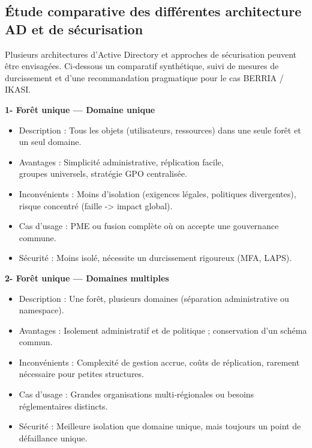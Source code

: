 \newpage

\subsection*{Étude comparative des différentes architecture AD et de sécurisation}
{}
\noindent Plusieurs architectures d'Active Directory et approches de sécurisation peuvent être envisagées. Ci‑dessous un comparatif synthétique, suivi de mesures de durcissement et d'une recommandation pragmatique pour le cas BERRIA / IKASI.

\noindent \textbf{1- Forêt unique — Domaine unique}
\begin{itemize}
	\item Description : Tous les objets (utilisateurs, ressources) dans une seule forêt et un seul domaine.
	\item Avantages : Simplicité administrative, réplication facile, \\ groupes universels, stratégie GPO centralisée.
	\item Inconvénients : Moins d'isolation (exigences légales, politiques divergentes), risque concentré (faille -> impact global).
	\item Cas d'usage : PME ou fusion complète où on accepte une gouvernance commune.
	\item Sécurité : Moins isolé, nécessite un durcissement rigoureux (MFA, LAPS).
\end{itemize}

\noindent \textbf{2- Forêt unique — Domaines multiples}
\begin{itemize}
	\item Description : Une forêt, plusieurs domaines (séparation administrative ou namespace).
	\item Avantages : Isolement administratif et de politique ; conservation d'un schéma commun.
	\item Inconvénients : Complexité de gestion accrue, coûts de réplication, rarement nécessaire pour petites structures.
	\item Cas d'usage : Grandes organisations multi‑régionales ou besoins réglementaires distincts.
	\item Sécurité : Meilleure isolation que domaine unique, mais toujours un point de défaillance unique.
\end{itemize}

